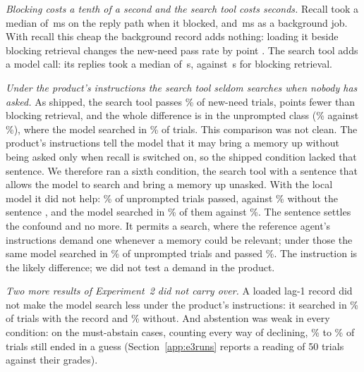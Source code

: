 \documentclass[10pt]{article}
\begin{document}
\emph{Blocking costs a tenth of a second and the search tool costs seconds.} Recall took a median of \KBlockMs\,ms on the reply path when it blocked, and \KOffpathMs\,ms as a background job. With recall this cheap the background record adds nothing: loading it beside blocking retrieval changes the new-need pass rate by \KDiffBothBlock{} point \KDiffBothBlockCI{}. The search tool adds a model call: its replies took a median of \KPathTool\,s, against \KPathBlock\,s for blocking retrieval.

\emph{Under the product's instructions the search tool seldom searches when nobody has asked.} As shipped, the search tool passes \KRecTool\% \KRecToolCI{} of new-need trials, \KDiffBlockTool{} points \KDiffBlockToolCI{} fewer than blocking retrieval, and the whole difference is in the unprompted class (\KUnpTool\% against \KUnpBlock\%), where the model searched in \KSrchUnpTool\% of trials. This comparison was not clean. The product's instructions tell the model that it may bring a memory up without being asked only when recall is switched on, so the shipped condition lacked that sentence. We therefore ran a sixth condition, the search tool with a sentence that allows the model to search and bring a memory up unasked. With the local model it did not help: \KBringUnp\% of unprompted trials passed, against \KShipUnp\% without the sentence \KShipVersion{}, and the model searched in \KBringSrchUnp\% of them against \KShipSrchUnp\%. The sentence settles the confound and no more. It permits a search, where the reference agent's instructions demand one whenever a memory could be relevant; under those the same model searched in \SrchUnpTool\% of unprompted trials and passed \UnpTool\%. The instruction is the likely difference; we did not test a demand in the product.

\emph{Two more results of Experiment~2 did not carry over.} A loaded lag-1 record did not make the model search less under the product's instructions: it searched in \KSrchHyb\% of trials with the record and \KSrchTool\% without. And abstention was weak in every condition: on the must-abstain cases, counting every way of declining, \KGuessMin\% to \KGuessMax\% of trials still ended in a guess (Section~\ref{app:e3runs} reports a reading of 50 trials against their grades).
\end{document}
